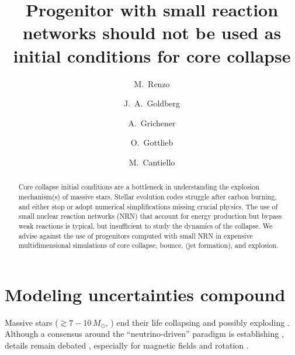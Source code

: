 \documentclass[twocolumn]{aastex63}
\begin{document}
\title{Progenitor with small reaction networks should not be used as
  initial conditions for core collapse}

\author[0000-0002-6718-9472]{M.~Renzo}

\author[0000-0003-1012-3031]{J.~A.~Goldberg}

\author[0000-0002-2215-1841]{A.~Grichener}

\author[0000-0003-3115-2456]{O.~Gottlieb}

\author[0000-0002-8171-8596]{M.~Cantiello}

\begin{abstract}
  \noindent
  Core collapse initial conditions are a bottleneck in understanding
  the explosion mechanism(s) of massive stars. Stellar evolution codes
  struggle after carbon burning, and either stop or adopt numerical
  simplifications missing crucial physics. The use of small nuclear
  reaction networks (NRN) that account for energy production but
  bypass weak reactions is typical, but insufficient to study the
  dynamics of the collapse. We advise against the use of progenitors
  computed with small NRN in expensive multidimensional simulations of
  core collapse, bounce, (jet formation), and explosion.
\end{abstract}

\section{Modeling uncertainties compound}

Massive stars ($\gtrsim 7-10\,M_\odot$, \citealt{doherty:15,
  poelarends:17}) end their life collapsing and possibly exploding
\citep[e.g.,][]{janka:12, burrows:21, soker:24}. Although a consensus
around the ``neutrino-driven'' paradigm is establishing
\citep[e.g.,][]{wang:23, nakamura:24}, details remain debated
\citep[e.g.,][]{shishkin:22, soker:22}, especially for magnetic
fields and rotation \citep[e.g.,][]{symbalisty:84, mosta:15, aloy:21}.
\end{document}
